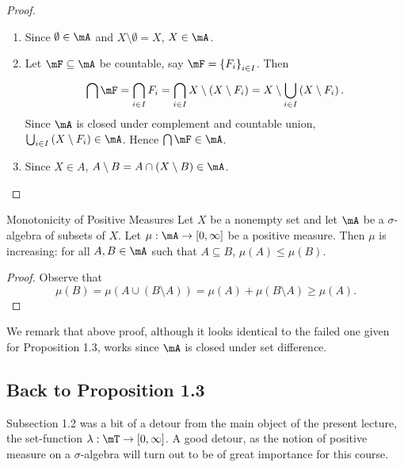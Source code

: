 \documentclass[pmath450]{subfiles}
\begin{document}
    \begin{proof}
        \begin{enumerate}
            \item Since $\emptyset\in\mA$ and $X\setminus\emptyset=X$, $X\in\mA$.
            \item Let $\mF\subseteq\mA$ be countable, say $\mF=\left\lbrace F_i \right\rbrace^{}_{i\in I}$. Then
                \begin{equation*}
                    \bigcap\mF = \bigcap^{}_{i\in I}F_i = \bigcap^{}_{i\in I}X\setminus\left( X\setminus F_i \right) = X\setminus\bigcup^{}_{i\in I}\left( X\setminus F_i \right).
                \end{equation*}
                Since $\mA$ is closed under complement and countable union, $\bigcup^{}_{i\in I}\left( X\setminus F_i \right)\in\mA$. Hence $\bigcap\mF\in\mA$.
            \item Since $X\in A$, $A\setminus B = A\cap \left( X\setminus B \right)\in\mA$.
        \end{enumerate}
    \end{proof}

    \begin{prop}{Monotonicity of Positive Measures}
        Let $X$ be a nonempty set and let $\mA$ be a $\sigma$-algebra of subsets of $X$. Let $\mu:\mA\to\left[ 0,\infty \right]$ be a positive measure. Then $\mu$ is increasing: for all $A,B\in\mA$ such that $A\subseteq B$, $\mu\left( A \right)\leq\mu\left( B \right)$.
    \end{prop}

    \begin{proof}
        Observe that
        \begin{equation*}
            \mu\left( B \right) = \mu\left( A\cup \left( B\setminus A \right) \right) = \mu\left( A \right)+\mu\left( B\setminus A \right)\geq \mu\left( A \right).
        \end{equation*}
    \end{proof}

    \np We remark that above proof, although it looks identical to the failed one given for Proposition 1.3, works since $\mA$ is closed under set difference.

    \subsection{Back to Proposition 1.3}

    Subsection 1.2 was a bit of a detour from the main object of the present lecture, the set-function $\lambda:\mT\to\left[ 0,\infty \right]$. A good detour, as the notion of positive measure on a $\sigma$-algebra will turn out to be of great importance for this course.
\end{document}
